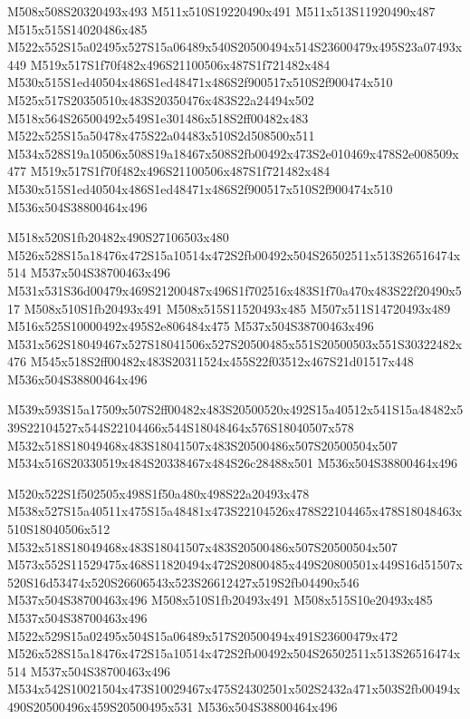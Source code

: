 \documentclass{article}
\begin{document}
\begin{multicols}{5}
\begin{center}
M508x508S20320493x493 %
M511x510S19220490x491 %
M511x513S11920490x487 %
M515x515S14020486x485 %
M522x552S15a02495x527S15a06489x540S20500494x514S23600479x495S23a07493x449 %
M519x517S1f70f482x496S21100506x487S1f721482x484 %
M530x515S1ed40504x486S1ed48471x486S2f900517x510S2f900474x510 %
M525x517S20350510x483S20350476x483S22a24494x502 %
M518x564S26500492x549S1e301486x518S2ff00482x483 %
M522x525S15a50478x475S22a04483x510S2d508500x511 %
M534x528S19a10506x508S19a18467x508S2fb00492x473S2e010469x478S2e008509x477 %
M519x517S1f70f482x496S21100506x487S1f721482x484 %
M530x515S1ed40504x486S1ed48471x486S2f900517x510S2f900474x510 %
M536x504S38800464x496 %

M518x520S1fb20482x490S27106503x480 %
M526x528S15a18476x472S15a10514x472S2fb00492x504S26502511x513S26516474x514 %
M537x504S38700463x496 %
M531x531S36d00479x469S21200487x496S1f702516x483S1f70a470x483S22f20490x517 %
M508x510S1fb20493x491 %
M508x515S11520493x485 %
M507x511S14720493x489 %
M516x525S10000492x495S2e806484x475 %
M537x504S38700463x496 %
M531x562S18049467x527S18041506x527S20500485x551S20500503x551S30322482x476 %
M545x518S2ff00482x483S20311524x455S22f03512x467S21d01517x448 %
M536x504S38800464x496 %

M539x593S15a17509x507S2ff00482x483S20500520x492S15a40512x541S15a48482x539S22104527x544S22104466x544S18048464x576S18040507x578 %
M532x518S18049468x483S18041507x483S20500486x507S20500504x507 %
M534x516S20330519x484S20338467x484S26c28488x501 %
M536x504S38800464x496 %

M520x522S1f502505x498S1f50a480x498S22a20493x478 %
M538x527S15a40511x475S15a48481x473S22104526x478S22104465x478S18048463x510S18040506x512 %
M532x518S18049468x483S18041507x483S20500486x507S20500504x507 %
M573x552S11529475x468S11820494x472S20800485x449S20800501x449S16d51507x520S16d53474x520S26606543x523S26612427x519S2fb04490x546 %
M537x504S38700463x496 %
M508x510S1fb20493x491 %
M508x515S10e20493x485 %
M537x504S38700463x496 %
M522x529S15a02495x504S15a06489x517S20500494x491S23600479x472 %
M526x528S15a18476x472S15a10514x472S2fb00492x504S26502511x513S26516474x514 %
M537x504S38700463x496 %
M534x542S10021504x473S10029467x475S24302501x502S2432a471x503S2fb00494x490S20500496x459S20500495x531 %
M536x504S38800464x496 %

\end{center}
\end{multicols}
\end{document}
